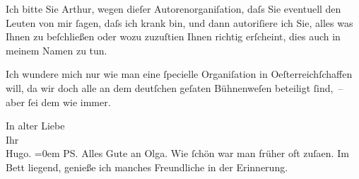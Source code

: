 \pstart
           Ich bitte Sie Arthur, wegen dieſer Autorenorganiſation, daſs Sie eventuell den Leuten von mir{ }ſagen, daſs ich
               krank bin, und dann autoriſiere ich Sie, alles was Ihnen zu {\pb}beſchließen oder wozu zuzuſti{\geminationm}en Ihnen richtig erſcheint, dies auch in meinem Namen
               zu tun.\pend
           
\pstart
           Ich wundere mich nur wie man eine{ }ſpecielle Organiſation in Oeſterreichſchaffen will, da wir doch alle an dem deutſchen
                  geſa{\geminationm}ten Bühnenweſen beteiligt{ }ſind, – aber{ }ſei dem
               wie immer.\pend
           
\pstart
           In alter Liebe{\\[\baselineskip]}Ihr{\\[\baselineskip]}\spacefill\mbox{Hugo.}\pend
           \leftskip=0em{}
\pstart
           \noindent{}\textsc{PS}. Alles Gute an Olga. Wie{ }ſchön war man früher oft zuſa{\geminationm}en.
                  Im Bett liegend, genieße ich manches Freundliche in der Erinnerung.\pend
           \endnumbering{}  \newcommand{\dateiname}{L02323}\newcommand{\titel}{Hugo Hofmannsthal an Arthur Schnitzler, 20. 4. 1919}\newcommand{\editorInnen}{Martin Anton Müller und Gerd-Hermann Susen}
